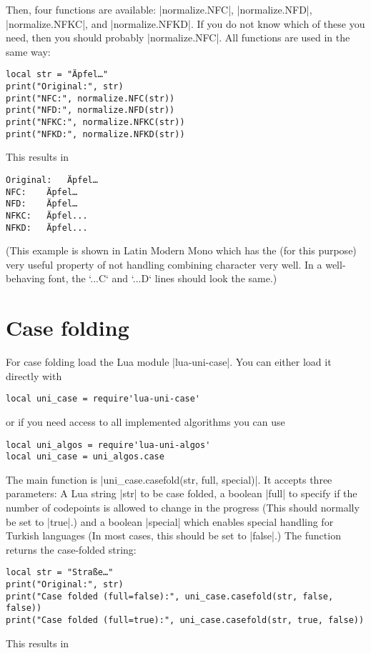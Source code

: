 \documentclass{article}
\begin{document}
Then, four functions are available: |normalize.NFC|, |normalize.NFD|, |normalize.NFKC|, and |normalize.NFKD|.
If you do not know which of these you need, then you should probably |normalize.NFC|. All functions are used in the same way:
\begin{verbatim}
local str = "Äpfel…"
print("Original:", str)
print("NFC:", normalize.NFC(str))
print("NFD:", normalize.NFD(str))
print("NFKC:", normalize.NFKC(str))
print("NFKD:", normalize.NFKD(str))
\end{verbatim}
This results in
\begin{verbatim}
Original:	Äpfel…
NFC:	Äpfel…
NFD:	Äpfel…
NFKC:	Äpfel...
NFKD:	Äpfel...
\end{verbatim}
(This example is shown in Latin Modern Mono which has the (for this purpose) very useful property of not handling combining character very well.
In a well-behaving font, the `...C` and `...D` lines should look the same.)

\section{Case folding}
For case folding load the Lua module |lua-uni-case|.
You can either load it directly with
\begin{verbatim}
local uni_case = require'lua-uni-case'
\end{verbatim}
or if you need access to all implemented algorithms you can use
\begin{verbatim}
local uni_algos = require'lua-uni-algos'
local uni_case = uni_algos.case
\end{verbatim}

The main function is |uni_case.casefold(str, full, special)|. It accepts three parameters: A Lua string |str| to be case folded, a boolean |full| to specify if the number of codepoints is allowed to change in the progress (This should normally be set to |true|.) and a boolean |special| which enables special handling for Turkish languages (In most cases, this should be set to |false|.)
The function returns the case-folded string:
\begin{verbatim}
local str = "Straße…"
print("Original:", str)
print("Case folded (full=false):", uni_case.casefold(str, false, false))
print("Case folded (full=true):", uni_case.casefold(str, true, false))
\end{verbatim}
This results in

\noindent\begingroup
  \ttfamily
  \par
\endgroup
\end{document}
